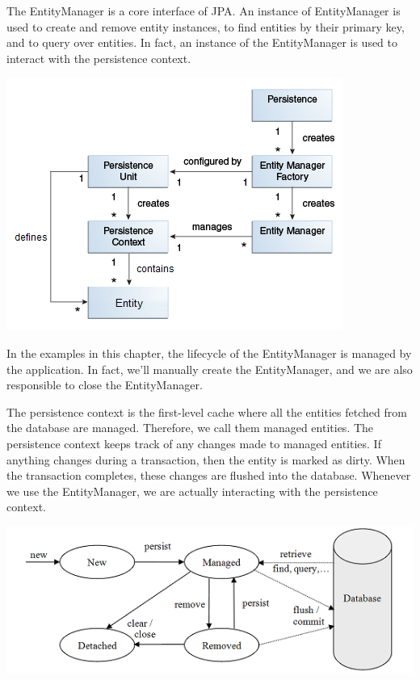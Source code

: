 The EntityManager is a core interface of JPA.  An instance of EntityManager is used to create and remove  entity instances, to find entities by their primary key,  and to query over entities.  In fact,  an instance of the EntityManager is used to interact with the persistence context. 

\includegraphics[width=\textwidth]{./images/chapter6/persistence}

In the examples in this chapter, the lifecycle of the EntityManager is managed by the application.
In fact, we'll manually create the EntityManager,  and we are also responsible to close the EntityManager.

The persistence context is the first-level cache where all the entities fetched from the database are managed.  Therefore, we call them managed entities.  The persistence context keeps track of any changes made to managed entities. If anything changes during a transaction, then the entity is marked as dirty. When the transaction completes, these changes are flushed into the database.
Whenever we use the EntityManager, we are actually interacting with the persistence context.

\includegraphics[width=\textwidth]{./images/chapter6/entity_states}


